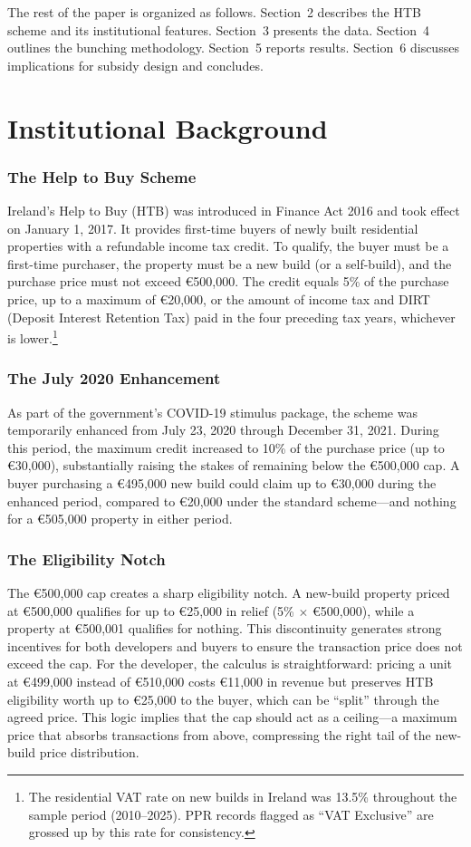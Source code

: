 \documentclass[12pt]{article}
\newcommand{\eur}[1]{\euro{}#1}
\begin{document}
The rest of the paper is organized as follows. Section~2 describes the HTB scheme and its institutional features. Section~3 presents the data. Section~4 outlines the bunching methodology. Section~5 reports results. Section~6 discusses implications for subsidy design and concludes.


\section{Institutional Background}

\subsubsection*{The Help to Buy Scheme} Ireland's Help to Buy (HTB) was introduced in Finance Act 2016 and took effect on January 1, 2017. It provides first-time buyers of newly built residential properties with a refundable income tax credit. To qualify, the buyer must be a first-time purchaser, the property must be a new build (or a self-build), and the purchase price must not exceed \eur{500,000}. The credit equals 5\% of the purchase price, up to a maximum of \eur{20,000}, or the amount of income tax and DIRT (Deposit Interest Retention Tax) paid in the four preceding tax years, whichever is lower.\footnote{The residential VAT rate on new builds in Ireland was 13.5\% throughout the sample period (2010--2025). PPR records flagged as ``VAT Exclusive'' are grossed up by this rate for consistency.}

\subsubsection*{The July 2020 Enhancement} As part of the government's COVID-19 stimulus package, the scheme was temporarily enhanced from July 23, 2020 through December 31, 2021. During this period, the maximum credit increased to 10\% of the purchase price (up to \eur{30,000}), substantially raising the stakes of remaining below the \eur{500,000} cap. A buyer purchasing a \eur{495,000} new build could claim up to \eur{30,000} during the enhanced period, compared to \eur{20,000} under the standard scheme---and nothing for a \eur{505,000} property in either period.

\subsubsection*{The Eligibility Notch} The \eur{500,000} cap creates a sharp eligibility notch. A new-build property priced at \eur{500,000} qualifies for up to \eur{25,000} in relief (5\% $\times$ \eur{500,000}), while a property at \eur{500,001} qualifies for nothing. This discontinuity generates strong incentives for both developers and buyers to ensure the transaction price does not exceed the cap. For the developer, the calculus is straightforward: pricing a unit at \eur{499,000} instead of \eur{510,000} costs \eur{11,000} in revenue but preserves HTB eligibility worth up to \eur{25,000} to the buyer, which can be ``split'' through the agreed price. This logic implies that the cap should act as a ceiling---a maximum price that absorbs transactions from above, compressing the right tail of the new-build price distribution.
\end{document}
